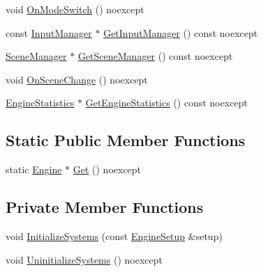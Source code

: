 \begin{DoxyCompactItemize}
void \hyperlink{classmage_1_1_engine_a6ac289fd093967c370955810e26d251f}{On\+Mode\+Switch} () noexcept
\item 
const \hyperlink{classmage_1_1_input_manager}{Input\+Manager} $\ast$ \hyperlink{classmage_1_1_engine_a9e8de859024c2b51d9b20ce498d6c07b}{Get\+Input\+Manager} () const noexcept
\item 
\hyperlink{classmage_1_1_scene_manager}{Scene\+Manager} $\ast$ \hyperlink{classmage_1_1_engine_adaec74f633fe6ed3a3e2ec745cd57343}{Get\+Scene\+Manager} () const noexcept
\item 
void \hyperlink{classmage_1_1_engine_a4bcc8811433865c349c8cc862d4f457d}{On\+Scene\+Change} () noexcept
\item 
\hyperlink{structmage_1_1_engine_statistics}{Engine\+Statistics} $\ast$ \hyperlink{classmage_1_1_engine_aacbd029d5e8f00e0acdb0f4d7cc04236}{Get\+Engine\+Statistics} () const noexcept
\end{DoxyCompactItemize}
\subsection*{Static Public Member Functions}
\begin{DoxyCompactItemize}
\item 
static \hyperlink{classmage_1_1_engine}{Engine} $\ast$ \hyperlink{classmage_1_1_engine_a146c8898afd978b4d1f0528128a43bbf}{Get} () noexcept
\end{DoxyCompactItemize}
\subsection*{Private Member Functions}
\begin{DoxyCompactItemize}
\item 
void \hyperlink{classmage_1_1_engine_a29a47448fb182b110d46d287a72b8b4e}{Initialize\+Systems} (const \hyperlink{structmage_1_1_engine_setup}{Engine\+Setup} \&setup)
\item 
void \hyperlink{classmage_1_1_engine_ac0632bce91156f13d4bc76f5b25fc94b}{Uninitialize\+Systems} () noexcept
\end{DoxyCompactItemize}
